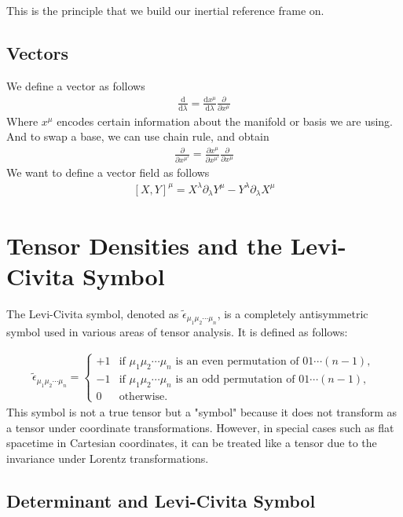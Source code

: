 \documentclass[12pt]{book}
\newcommand{\pypx}[2]{\frac{\partial #1}{\partial #2}}
\newcommand{\dydx}[2]{\frac{\text{d} #1}{\text{d} #2}}
\newcommand{\sqbkt}[1]{\left[ #1 \right]}
\begin{document}
This is the principle that we build our inertial reference frame on. 

\subsection{Vectors}
We define a vector as follows
\begin{align}
\dydx{}{\lambda} = \dydx{x^\mu}{\lambda}\pypx{}{x^\mu}
\end{align}
Where $x^\mu$ encodes certain information about the manifold or basis we are using. And to swap a base, we can use chain rule, and obtain
\begin{align}
\pypx{}{x^{\mu'}} = \pypx{x^{\mu}}{x^{\mu'}}\pypx{}{x^{\mu}}
\end{align}
We want to define a vector field as follows
\begin{align}
\sqbkt{X,Y}^\mu = X^{\lambda}\partial_{\lambda}Y^{\mu}-Y^{\lambda}\partial_{\lambda}X^{\mu}
\end{align}

\section{Tensor Densities and the Levi-Civita Symbol}

The Levi-Civita symbol, denoted as \( \tilde{\epsilon}_{\mu_1 \mu_2 \cdots \mu_n} \), is a completely antisymmetric symbol used in various areas of tensor analysis. It is defined as follows:

\begin{align}
\tilde{\epsilon}_{\mu_1 \mu_2 \cdots \mu_n} =
\begin{cases} 
+1 & \text{if } \mu_1 \mu_2 \cdots \mu_n \text{ is an even permutation of } 01 \cdots (n-1), \\
-1 & \text{if } \mu_1 \mu_2 \cdots \mu_n \text{ is an odd permutation of } 01 \cdots (n-1), \\
0  & \text{otherwise.}
\end{cases}
\end{align}
This symbol is not a true tensor but a "symbol" because it does not transform as a tensor under coordinate transformations. However, in special cases such as flat spacetime in Cartesian coordinates, it can be treated like a tensor due to the invariance under Lorentz transformations.

\subsection{Determinant and Levi-Civita Symbol}
\end{document}

